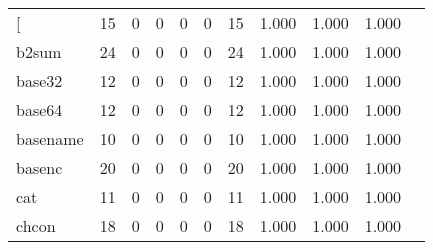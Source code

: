 \begin{longtable}{lp{1.10cm}p{1.10cm}p{1.10cm}p{1.10cm}p{1.10cm}p{1.10cm}p{1.10cm}p{1.10cm}p{1.10cm}p{1.10cm}}
\bottomrule
\endlastfoot
{[}         &                     15 &                                  0 &                                 0 &                                0 &                                 0 &                              15 &                          1.000 &                                 1.000 &                               1.000 \\
b2sum     &                     24 &                                  0 &                                 0 &                                0 &                                 0 &                              24 &                          1.000 &                                 1.000 &                               1.000 \\
base32    &                     12 &                                  0 &                                 0 &                                0 &                                 0 &                              12 &                          1.000 &                                 1.000 &                               1.000 \\
base64    &                     12 &                                  0 &                                 0 &                                0 &                                 0 &                              12 &                          1.000 &                                 1.000 &                               1.000 \\
basename  &                     10 &                                  0 &                                 0 &                                0 &                                 0 &                              10 &                          1.000 &                                 1.000 &                               1.000 \\
basenc    &                     20 &                                  0 &                                 0 &                                0 &                                 0 &                              20 &                          1.000 &                                 1.000 &                               1.000 \\
cat       &                     11 &                                  0 &                                 0 &                                0 &                                 0 &                              11 &                          1.000 &                                 1.000 &                               1.000 \\
chcon     &                     18 &                                  0 &                                 0 &                                0 &                                 0 &                              18 &                          1.000 &                                 1.000 &                               1.000 \\

\end{longtable}
